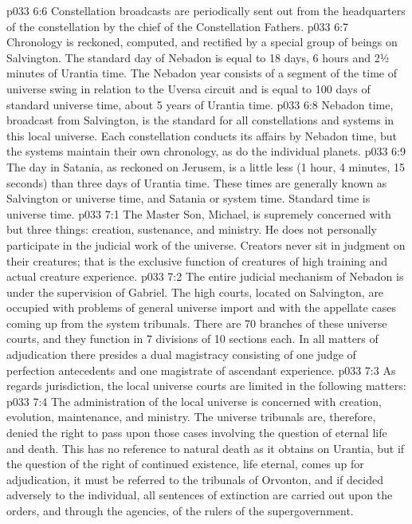 \vs p033 6:6 Constellation broadcasts are periodically sent out from the headquarters of the constellation by the chief of the Constellation Fathers.
\vs p033 6:7 \pc Chronology is reckoned, computed, and rectified by a special group of beings on Salvington. The standard day of Nebadon is equal to 18 days, 6 hours and 2½ minutes of Urantia time. The Nebadon year consists of a segment of the time of universe swing in relation to the Uversa circuit and is equal to 100 days of standard universe time, about 5 years of Urantia time.
\vs p033 6:8 Nebadon time, broadcast from Salvington, is the standard for all constellations and systems in this local universe. Each constellation conducts its affairs by Nebadon time, but the systems maintain their own chronology, as do the individual planets.
\vs p033 6:9 The day in Satania, as reckoned on Jerusem, is a little less (1 hour, 4 minutes, 15 seconds) than three days of Urantia time. These times are generally known as Salvington or universe time, and Satania or system time. Standard time is universe time.
\vs p033 7:1 The Master Son, Michael, is supremely concerned with but three things: creation, sustenance, and ministry. He does not personally participate in the judicial work of the universe. Creators never sit in judgment on their creatures; that is the exclusive function of creatures of high training and actual creature experience.
\vs p033 7:2 The entire judicial mechanism of Nebadon is under the supervision of Gabriel. The high courts, located on Salvington, are occupied with problems of general universe import and with the appellate cases coming up from the system tribunals. There are 70 branches of these universe courts, and they function in 7 divisions of 10 sections each. In all matters of adjudication there presides a dual magistracy consisting of one judge of perfection antecedents and one magistrate of ascendant experience.
\vs p033 7:3 As regards jurisdiction, the local universe courts are limited in the following matters:
\vs p033 7:4 \bibnobreakspace The administration of the local universe is concerned with creation, evolution, maintenance, and ministry. The universe tribunals are, therefore, denied the right to pass upon those cases involving the question of eternal life and death. This has no reference to natural death as it obtains on Urantia, but if the question of the right of continued existence, life eternal, comes up for adjudication, it must be referred to the tribunals of Orvonton, and if decided adversely to the individual, all sentences of extinction are carried out upon the orders, and through the agencies, of the rulers of the supergovernment.
